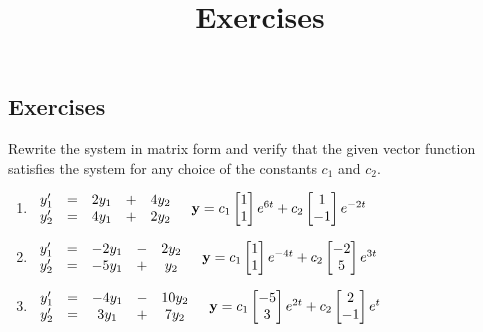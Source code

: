 \documentclass{ximera}
\title{Exercises} \license{CC BY-NC-SA 4.0}
\begin{document}
\begin{abstract}
\end{abstract}
\maketitle

\begin{onlineOnly}
\section*{Exercises}
\end{onlineOnly}


\begin{problem}\label{exer:10.2.1}
Rewrite the system in matrix form and
 verify that the given vector function satisfies the  system for
any choice of the constants $c_1$ and $c_2$.

\begin{enumerate}
\item %
 $\begin{array}{ccccc}y'_1&=&2y_1& + &4y_2\\
y_2'&=&4y_1&+&2y_2\end{array}  \quad
{\bf y}=c_1\begin{bmatrix}1\\1\end{bmatrix}e^{6t}+c_2\begin{bmatrix}1\\-1\end{bmatrix}e^{-2t}$

\item %
 $\begin{array}{ccccc}y'_1&=&-2y_1& -& 2y_2\\
y_2'&=&-5y_1 &+&y_2\end{array}  \quad
{\bf y}=c_1\begin{bmatrix}1\\1\end{bmatrix}e^{-4t}+c_2\begin{bmatrix}-2\\5\end{bmatrix}e^{3t}$

\item %
 $\begin{array}{ccccc}y'_1&=&-4y_1& -&10y_2\\
y_2'&=&3y_1 &+& 7y_2\end{array}  \quad
{\bf y}=c_1\begin{bmatrix}-5\\3\end{bmatrix}e^{2t}+c_2\begin{bmatrix}2\\-1\end{bmatrix}e^t$


\end{enumerate}
\end{problem}
\end{document}
